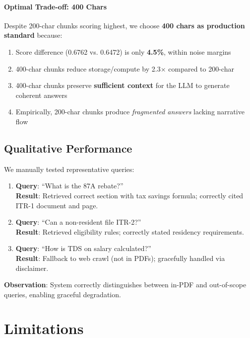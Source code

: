 \documentclass[11pt,a4paper]{article}
\begin{document}
\paragraph{Optimal Trade-off: 400 Chars}
Despite 200-char chunks scoring highest, we choose \textbf{400 chars as production standard} because:
\begin{enumerate}
    \item Score difference (0.6762 vs. 0.6472) is only \textbf{4.5\%}, within noise margins
    \item 400-char chunks reduce storage/compute by 2.3$\times$ compared to 200-char
    \item 400-char chunks preserve \textbf{sufficient context} for the LLM to generate coherent answers
    \item Empirically, 200-char chunks produce \textit{fragmented answers} lacking narrative flow
\end{enumerate}

\subsection{Qualitative Performance}

We manually tested representative queries:

\begin{enumerate}
    \item \textbf{Query}: ``What is the 87A rebate?''
    \\
    \textbf{Result}: Retrieved correct section with tax savings formula; correctly cited ITR-1 document and page.
    
    \item \textbf{Query}: ``Can a non-resident file ITR-2?''
    \\
    \textbf{Result}: Retrieved eligibility rules; correctly stated residency requirements.
    
    \item \textbf{Query}: ``How is TDS on salary calculated?''
    \\
    \textbf{Result}: Fallback to web crawl (not in PDFs); gracefully handled via disclaimer.
\end{enumerate}

\textbf{Observation}: System correctly distinguishes between in-PDF and out-of-scope queries, enabling graceful degradation.

\section{Limitations}
\label{sec:limitations}
\end{document}
